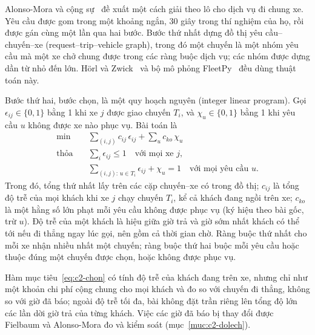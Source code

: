 Alonso-Mora và cộng sự~\cite{alonsomora2017} đề xuất một cách giải theo lô cho dịch vụ đi chung xe. Yêu cầu được gom
trong một khoảng ngắn, 30 giây trong thí nghiệm của họ, rồi được gán cùng một lần qua hai bước. Bước thứ nhất dựng
đồ thị yêu cầu--chuyến--xe (request--trip--vehicle graph), trong đó một chuyến là một nhóm yêu cầu mà một xe chở chung
được trong các ràng buộc dịch vụ; các nhóm được dựng dần từ nhỏ đến lớn. Hörl và Zwick~\cite{horl2022} và bộ mô
phỏng FleetPy~\cite{engelhardt2026} đều dùng thuật toán này.

Bước thứ hai, bước chọn, là một quy hoạch nguyên (integer linear program). Gọi $\epsilon_{ij} \in \{0, 1\}$ bằng 1
khi xe $j$ được giao chuyến $T_i$, và $\chi_u \in \{0, 1\}$ bằng 1 khi yêu cầu $u$ không được xe nào phục vụ. Bài
toán là
\begin{equation}
\begin{aligned}
\min\quad & \sum_{(i,j)} c_{ij}\,\epsilon_{ij} + \sum_{u} c_{ko}\,\chi_u\\
\text{thỏa}\quad & \sum_{i} \epsilon_{ij} \le 1 \quad \text{với mọi xe } j,\\
& \sum_{(i,j):\, u \in T_i} \epsilon_{ij} + \chi_u = 1 \quad \text{với mọi yêu cầu } u .
\end{aligned}
\label{eq:c2-chon}
\end{equation}
Trong đó, tổng thứ nhất lấy trên các cặp chuyến--xe có trong đồ thị; $c_{ij}$ là tổng độ trễ của mọi khách khi xe $j$
chạy chuyến $T_i$, kể cả khách đang ngồi trên xe; $c_{ko}$ là một hằng số lớn phạt mỗi yêu cầu không được phục vụ (ký
hiệu theo bài gốc, trừ $u$). Độ trễ của một khách là hiệu giữa giờ trả và giờ sớm nhất khách có thể tới nếu đi thẳng ngay lúc
gọi, nên gồm cả thời gian chờ. Ràng buộc thứ nhất cho mỗi xe nhận nhiều nhất một chuyến; ràng buộc thứ hai buộc mỗi
yêu cầu hoặc thuộc đúng một chuyến được chọn, hoặc không được phục vụ.

Hàm mục tiêu~\eqref{eq:c2-chon} có tính độ trễ của khách đang trên xe, nhưng chỉ như một khoản chi phí cộng chung cho
mọi khách và đo so với chuyến đi thẳng, không so với giờ đã báo; ngoài độ trễ tối đa, bài không đặt trần riêng lên
tổng độ lớn các lần dời giờ trả của từng khách. Việc các giờ đã báo bị thay đổi được Fielbaum và Alonso-Mora đo và
kiểm soát (mục~\ref{muc:c2-dolech}).

